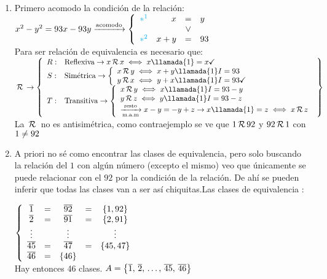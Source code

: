 \documentclass[12pt,a4paper, spanish]{article}
\begin{document}
\separadorCorto

\begin{enumerate}[label=\roman*)]
	\item Primero acomodo la condición de la relación:\\
	      $x^2 - y^2 = 93x - 93y \flecha{acomodo}
		      \llave{rrcl}{
			      \cyan{$*^1$} & x & = & y  \\
			      & & \o &\\
			      \cyan{$*^2$} & x + y & = & 93
		      }$\\
	      Para ser relación de equivalencia es necesario que:\\
	      $\relacion \to
		      \llaves{cl}{
			      R: & \text{Reflexiva} \to x \relacion x \sisolosi x \llamada{1} = x  \checkmark\\
			      S: & \text{Simétrica} \to
			      \llave{l}{
				      x \relacion y \sisolosi x + y\llamada{1}I = 93\\
				      y \relacion x \sisolosi y + x \llamada{1}I = 93  \checkmark
			      }\\
			      T: & \text{Transitiva} \to
			      \llave{l}{
				      x \relacion y \sisolosi x \llamada{1}I = 93 - y\\
				      y \relacion z \sisolosi y \llamada{1}I = 93 - z \\
				      \flecha{resto}[m.a.m] x - y = -y + z \to x \llamada{1} = z \sisolosi x \relacion z
			      }\\
		      }$\\
	      La $\relacion$ no es antisimétrica, como contraejemplo se ve que $1 \relacion 92$ y $92 \relacion 1$ con $1 \distinto 92$

	\item
	      \begin{minipage}{0.2\textwidth}
		      \veintisiete
	      \end{minipage}
	      \begin{minipage}{0.7\textwidth}
		      A priori no sé como encontrar las clases de equivalencia, pero solo buscando la relación del $1$ con algún número (excepto el mismo) veo que únicamente
		      se puede relacionar con el $92$ por la condición de la relación. De ahí se pueden inferir que todas las clases van a ser así chiquitas.Las clases de equivalencia :

		      $\llave{ccccc}{
				      \clase{1} & = & \clase{92} & = & \set{1, 92}\\
				      \clase{2} & = & \clase{91} & = & \set{2, 91}\\
				      \vdots  &   & \vdots   &   & \vdots\\
				      \clase{45} & = & \clase{47} & = & \set{45, 47}\\
				      \clase{46} & = & \set{46}
			      }$\\
		      Hay entonces 46 clases. $A = \set{\clase{1},\, \clase{2},\, \dots,\, \clase{45},\, \clase{46}}$
	      \end{minipage}
\end{enumerate}
\end{document}
